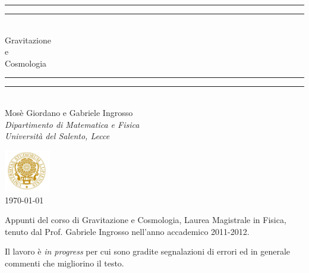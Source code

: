 \documentclass[a4paper,twoside,openright,fleqn,11pt]{book}
\theoremstyle{plain}
\begin{document}
\frontmatter{}

\thispagestyle{empty}
\begingroup
\scshape
\centering
\vspace*{\baselineskip}
\rule{\textwidth}{1.6pt}\vspace*{-\baselineskip}\vspace*{2pt}
\rule{\textwidth}{0.4pt}\\[0.2\baselineskip]
{\Huge Gravitazione\\ e \\[0.3\baselineskip]
  Cosmologia}\\[0.2\baselineskip]
\rule{\textwidth}{0.4pt}\vspace*{-\baselineskip}\vspace{3.2pt}
\rule{\textwidth}{1.6pt}\\[\baselineskip]
\vspace*{2\baselineskip}
{\Large
  Mosè Giordano e  Gabriele Ingrosso} \\
{\it Dipartimento di Matematica e Fisica \\
 Università del Salento, Lecce}

\vfill
\includegraphics[width=2cm]{figure/logo_unisalento}\\
\today\par
\endgroup

\newpage
{\large
 Appunti del corso di Gravitazione e Cosmologia, Laurea Magistrale in Fisica,
 tenuto dal Prof. Gabriele Ingrosso nell'anno accademico 2011-2012.


 Il lavoro è \emph{in progress} per cui sono gradite segnalazioni di errori ed
 in generale commenti che migliorino il testo.}

\cleardoublepage{}
\tableofcontents{} %
\cleardoublepage{}
\listoffigures{} %



\cleardoublepage{}
\mainmatter{}








%
%

\appendix{}




\backmatter{}

\cleardoublepage{}
{}
\nocite{adler:relativity}
\printbibliography

\cleardoublepage{}
{}
\printindex{}
\end{document}
